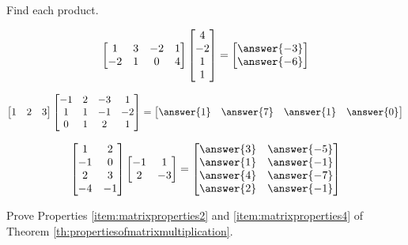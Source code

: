 \documentclass{ximera}
\begin{document}
\begin{problem}
Find each product.
\begin{problem}\label{prob:matprod1}
$$\begin{bmatrix}1&3&-2&1\\-2&1&0&4\end{bmatrix}\begin{bmatrix}4\\-2\\1\\1\end{bmatrix}=\begin{bmatrix}\answer{-3}\\\answer{-6}\end{bmatrix}$$
\end{problem}
\begin{problem}\label{prob:matprod2}
$$\begin{bmatrix}1&2&3\end{bmatrix}\begin{bmatrix}-1&2&-3&1\\1&1&-1&-2\\0&1&2&1\end{bmatrix}=\begin{bmatrix}\answer{1}&\answer{7}&\answer{1}&\answer{0}\end{bmatrix}$$
\end{problem}
\begin{problem}\label{prob:matprod3}
$$\begin{bmatrix}1&2\\-1&0\\2&3\\-4&-1\end{bmatrix}\begin{bmatrix}-1&1\\2&-3\end{bmatrix}=\begin{bmatrix}\answer{3}&\answer{-5}\\\answer{1}&\answer{-1}\\\answer{4}&\answer{-7}\\\answer{2}&\answer{-1}\end{bmatrix}
$$
\end{problem}
\end{problem}

\begin{problem}\label{prob:matrixproperties2}
Prove Properties \ref{item:matrixproperties2} and \ref{item:matrixproperties4} of Theorem \ref{th:propertiesofmatrixmultiplication}.
\end{problem}
\end{document}
